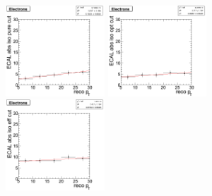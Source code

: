 \begin{figure}[htbp]
   \includegraphics[width = 0.33\textwidth]{pictures/optIsoCut/ecalIso_elec_pure.png}
   \includegraphics[width = 0.33\textwidth]{pictures/optIsoCut/ecalIso_elec_opt.png}
   \includegraphics[width = 0.33\textwidth]{pictures/optIsoCut/ecalIso_elec_eff.png}
   \label{fig:optEcalIso_elec}
\end{figure}


